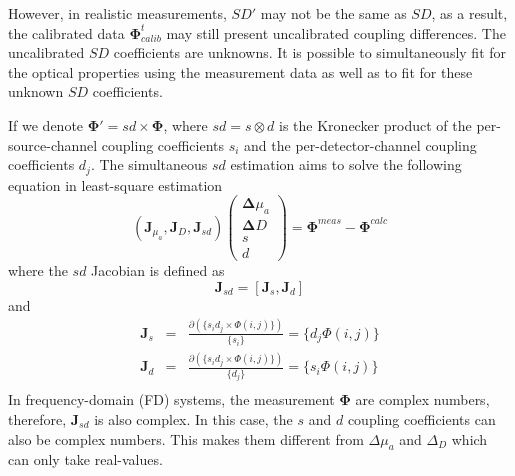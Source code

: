\documentclass[12pt]{book}               %
\begin{document}
However, in realistic measurements, $SD'$ may not be the same as $SD$, as a result, the calibrated data $\mathbf{\Phi}^{t}_{calib}$ may still present uncalibrated coupling differences. The uncalibrated $SD$ coefficients are unknowns. It is possible to simultaneously fit for the optical properties using the measurement data as well as to fit for these unknown $SD$ coefficients.

If we denote $\mathbf{\Phi}'=sd\times\mathbf{\Phi}$, where $sd=s\otimes d$ is the Kronecker product of the per-source-channel coupling coefficients $s_i$ and the per-detector-channel coupling coefficients $d_j$. The simultaneous $sd$ estimation aims to solve the following equation in least-square estimation
\begin{equation}
\left(\mathbf{J}_{\mu_a},\mathbf{J}_{D},\mathbf{J}_{sd}\right)\left(
\begin{array}{c}
\boldsymbol{\Delta}{\mu_a}\\
\boldsymbol{\Delta}{D} \\
s\\d
\end{array}
\right)=\boldsymbol{\Phi}^{meas}-\boldsymbol{\Phi}^{calc}
\end{equation}
where the $sd$ Jacobian is defined as
\begin{equation}\label{eq:Jsd}
\mathbf{J}_{sd}=\left[\mathbf{J}_{s}, \mathbf{J}_{d}\right]
\end{equation}
and
\begin{eqnarray}\label{eq:JsJd}
\mathbf{J}_{s} &=& \frac{\partial(\{s_id_j\times\Phi(i,j)\})}{\{s_i\}}=\{d_j\Phi(i,j)\}\\
\mathbf{J}_{d} &=& \frac{\partial(\{s_id_j\times\Phi(i,j)\})}{\{d_j\}}=\{s_i\Phi(i,j)\}\\
\end{eqnarray}
In frequency-domain (FD) systems, the measurement $\mathbf\Phi$ are complex numbers, therefore, $\mathbf{J}_{sd}$ is also complex. In this case, the $s$ and $d$ coupling coefficients can also be complex numbers. This makes them different from $\Delta\mu_a$ and $\Delta_D$ which can only take real-values.
\end{document}
